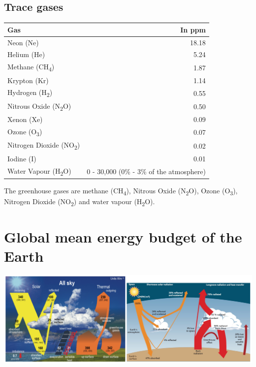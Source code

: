 \documentclass[11pt]{article}
\begin{document}
\subsection{Trace gases}
\label{sec:org075d333}
\begin{center}
\begin{tabular}{l|r}
Gas & In ppm\\[0pt]
\hline
Neon (Ne) & 18.18\\[0pt]
Helium (He) & 5.24\\[0pt]
Methane (CH\textsubscript{4}) & 1.87\\[0pt]
Krypton (Kr) & 1.14\\[0pt]
Hydrogen (H\textsubscript{2}) & 0.55\\[0pt]
Nitrous Oxide (N\textsubscript{2}O) & 0.50\\[0pt]
Xenon (Xe) & 0.09\\[0pt]
Ozone (O\textsubscript{3}) & 0.07\\[0pt]
Nitrogen Dioxide (NO\textsubscript{2}) & 0.02\\[0pt]
Iodine (I) & 0.01\\[0pt]
Water Vapour (H\textsubscript{2}O) & 0 - 30,000 (0\% - 3\% of the atmosphere)\\[0pt]
\end{tabular}
\end{center}

The greenhouse gases are methane (CH\textsubscript{4}), Nitrous Oxide (N\textsubscript{2}O), Ozone (O\textsubscript{3}), Nitrogen Dioxide (NO\textsubscript{2}) and water vapour (H\textsubscript{2}O).


\section{Global mean energy budget of the Earth}
\label{sec:org0387535}
\begin{center}
\includegraphics[width=.9\linewidth]{./images/global-mean-energy-budget.png}
\end{center}
\end{document}
